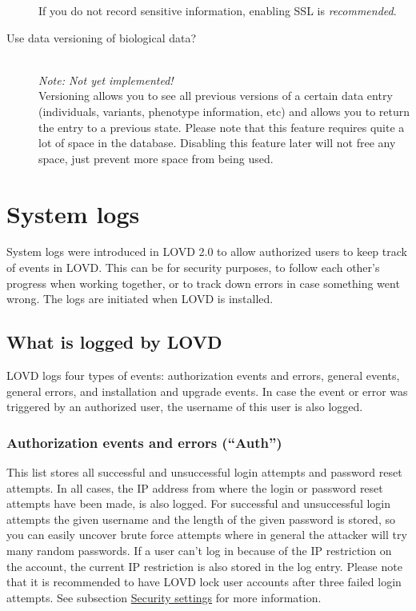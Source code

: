\documentclass[a4paper,oneside,openany,12pt]{memoir}
\renewenvironment{leftbar}[1][\hsize]
{%
    \def\FrameCommand
    {%
        {\color{LOVDdark}\vrule width 3pt \hspace{5pt}}%
        \colorbox{LOVDlight}%
    }%
    \MakeFramed{\hsize#1\advance\hsize-\width\FrameRestore}%
}
{\endMakeFramed}
\begin{document}
\begin{description}
  \nopagebreak
  If you do not record sensitive information, enabling SSL is \emph{recommended}.
  \item[Use data versioning of biological data?] \hfill \\
  \emph{Note: Not yet implemented!}
  \\
  Versioning allows you to see all previous versions of a certain data entry (individuals, variants,
   phenotype information, etc) and allows you to return the entry to a previous state.
  Please note that this feature requires quite a lot of space in the database.
  Disabling this feature later will not free any space, just prevent more space from being used.
\end{description}





\section{System logs}
System logs were introduced in LOVD 2.0 to allow authorized users to keep track of events in LOVD.
This can be for security purposes, to follow each other's progress when working together,
or to track down errors in case something went wrong.
The logs are initiated when LOVD is installed.



\subsection{What is logged by LOVD}
LOVD logs four types of events: authorization events and errors, general events, general errors, and installation and upgrade events.
In case the event or error was triggered by an authorized user, the username of this user is also logged.

\subsubsection{Authorization events and errors (``Auth'')}
This list stores all successful and unsuccessful login attempts and password reset attempts.
In all cases, the IP address from where the login or password reset attempts have been made, is also logged.
For successful and unsuccessful login attempts the given username and the length of the given password is stored,
 so you can easily uncover brute force attempts where in general the attacker will try many random passwords.
If a user can't log in because of the IP restriction on the account, the current IP restriction is also stored in the log entry.
Please note that it is recommended to have LOVD lock user accounts after three failed login attempts.
See subsection \hyperlink{ss_security_settings}{Security settings} for more information.
\end{document}
